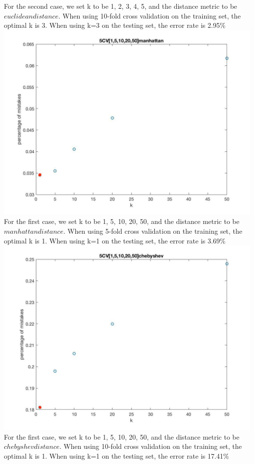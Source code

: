 \documentclass[11pt]{article} %
\begin{document}
For the second case, we set k to be 1, 2, 3, 4, 5, and the distance metric to be $euclidean distance$. When using 10-fold cross validation on the training set, the optimal k is 3. When using k=3 on the testing set, the error rate is 2.95\%\\
\includegraphics[scale=0.4]{5CV[1,5,10,20,50]manhattan.jpg}\\
For the first case, we set k to be 1, 5, 10, 20, 50, and the distance metric to be $manhattan distance$. When using 5-fold cross validation on the training set, the optimal k is 1. When using k=1 on the testing set, the error rate is 3.69\%\\
\includegraphics[scale=0.4]{5CV[1,5,10,20,50]chebyshev.jpg}\\
For the first case, we set k to be 1, 5, 10, 20, 50, and the distance metric to be $chebyshev distance$. When using 10-fold cross validation on the training set, the optimal k is 1. When using k=1 on the testing set, the error rate is 17.41\%\\\linebreak\linebreak
\end{document}

